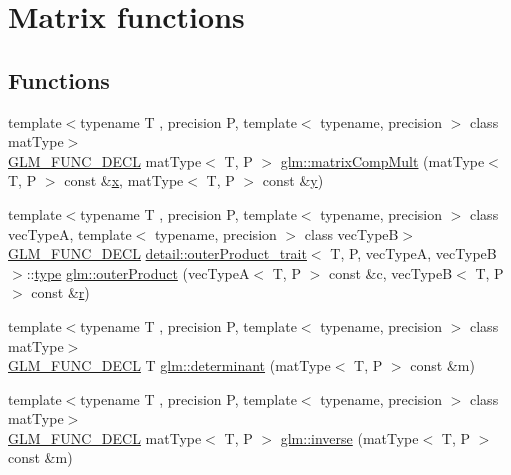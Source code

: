 \hypertarget{group__core__func__matrix}{}\section{Matrix functions}
\label{group__core__func__matrix}
\subsection*{Functions}
\begin{DoxyCompactItemize}
\item 
{\footnotesize template$<$typename T , precision P, template$<$ typename, precision $>$ class mat\+Type$>$ }\\\mbox{\hyperlink{setup_8hpp_ab2d052de21a70539923e9bcbf6e83a51}{G\+L\+M\+\_\+\+F\+U\+N\+C\+\_\+\+D\+E\+CL}} mat\+Type$<$ T, P $>$ \mbox{\hyperlink{group__core__func__matrix_ga4a54992e4741188ee624b21e3ba91814}{glm\+::matrix\+Comp\+Mult}} (mat\+Type$<$ T, P $>$ const \&\mbox{\hyperlink{glad_8h_a92d0386e5c19fb81ea88c9f99644ab1d}{x}}, mat\+Type$<$ T, P $>$ const \&\mbox{\hyperlink{glad_8h_a66ddd433d2cacfe27f5906b7e86faeed}{y}})
\item 
{\footnotesize template$<$typename T , precision P, template$<$ typename, precision $>$ class vec\+TypeA, template$<$ typename, precision $>$ class vec\+TypeB$>$ }\\\mbox{\hyperlink{setup_8hpp_ab2d052de21a70539923e9bcbf6e83a51}{G\+L\+M\+\_\+\+F\+U\+N\+C\+\_\+\+D\+E\+CL}} \mbox{\hyperlink{structglm_1_1detail_1_1outer_product__trait}{detail\+::outer\+Product\+\_\+trait}}$<$ T, P, vec\+TypeA, vec\+TypeB $>$\+::\mbox{\hyperlink{structglm_1_1type}{type}} \mbox{\hyperlink{group__core__func__matrix_gae9f513dc8e4f3ceb993669321b6d0f09}{glm\+::outer\+Product}} (vec\+TypeA$<$ T, P $>$ const \&c, vec\+TypeB$<$ T, P $>$ const \&\mbox{\hyperlink{glad_8h_abe08814c2f72843fde4d8df41440d5a0}{r}})
\item 
{\footnotesize template$<$typename T , precision P, template$<$ typename, precision $>$ class mat\+Type$>$ }\\\mbox{\hyperlink{setup_8hpp_ab2d052de21a70539923e9bcbf6e83a51}{G\+L\+M\+\_\+\+F\+U\+N\+C\+\_\+\+D\+E\+CL}} T \mbox{\hyperlink{group__core__func__matrix_ga26ea77c574802bc6fc193c40478718d2}{glm\+::determinant}} (mat\+Type$<$ T, P $>$ const \&m)
\item 
{\footnotesize template$<$typename T , precision P, template$<$ typename, precision $>$ class mat\+Type$>$ }\\\mbox{\hyperlink{setup_8hpp_ab2d052de21a70539923e9bcbf6e83a51}{G\+L\+M\+\_\+\+F\+U\+N\+C\+\_\+\+D\+E\+CL}} mat\+Type$<$ T, P $>$ \mbox{\hyperlink{group__core__func__matrix_gaff4e89603cf51cdbcedebc57cd8808a3}{glm\+::inverse}} (mat\+Type$<$ T, P $>$ const \&m)
\end{DoxyCompactItemize}



